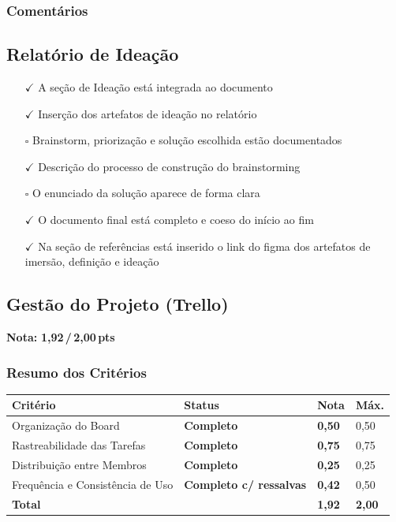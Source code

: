 \documentclass[
  sigconf,
  nonacm, %
  language=portuguese
]{acmart}
\newcommand{\notadestaque}[2]{%
  \noindent\textbf{Nota:}\enspace%
  {\large\bfseries\color{cred}#1\,/\,#2\,pts}%
}
\newcommand{\statusok}[1]{{\small\bfseries\color{cgood}#1}}
\newcommand{\statuswarn}[1]{{\small\bfseries\color{cwarn}#1}}
\begin{document}
\subsubsection*{Comentários}

\subsection{Relatório de Ideação}

\noindent\statuswarn{0,65\,/\,1,00 pts · Faltou pouco}

\begin{itemize}[leftmargin=14pt,itemsep=1pt,topsep=3pt,parsep=0pt]
  \item[\textcolor{cgood}{$\checkmark$}] {\small\textcolor{cgood}{A seção de Ideação está integrada ao documento}}
  \item[\textcolor{cgood}{$\checkmark$}] {\small\textcolor{cgood}{Inserção dos artefatos de ideação no relatório}}
  \item[$\square$] {\small\textcolor{cmuted}{Brainstorm, priorização e solução escolhida estão documentados}}
  \item[\textcolor{cgood}{$\checkmark$}] {\small\textcolor{cgood}{Descrição do processo de construção do brainstorming}}
  \item[$\square$] {\small\textcolor{cmuted}{O enunciado da solução aparece de forma clara}}
  \item[\textcolor{cgood}{$\checkmark$}] {\small\textcolor{cgood}{O documento final está completo e coeso do início ao fim}}
  \item[\textcolor{cgood}{$\checkmark$}] {\small\textcolor{cgood}{Na seção de referências está inserido o link do figma dos artefatos de imersão, definição e ideação}}
\end{itemize}

\subsection{Gestão do Projeto (Trello)}

\notadestaque{1,92}{2,00}

\subsubsection*{Resumo dos Critérios}

\begin{tabular}{@{} L{2.6cm} C{2.5cm} C{1.1cm} C{1.1cm} @{}}
\toprule
\textbf{Critério} & \textbf{Status} & \textbf{Nota} & \textbf{Máx.} \\
\midrule
Organização do Board & \statusok{Completo} & \textbf{0,50} & 0,50 \\
Rastreabilidade das Tarefas & \statusok{Completo} & \textbf{0,75} & 0,75 \\
Distribuição entre Membros & \statusok{Completo} & \textbf{0,25} & 0,25 \\
Frequência e Consistência de Uso & \statuswarn{Completo c/ ressalvas} & \textbf{0,42} & 0,50 \\
\midrule
\textbf{Total} & & \textbf{\color{cred}1,92} & \textbf{2,00} \\
\bottomrule
\end{tabular}
\end{document}
